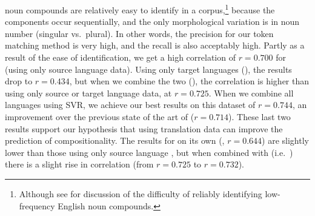 \documentclass[output=paper,modfonts,nonflat]{langsci/langscibook}
\begin{document}
 noun compounds are relatively easy to identify in a
corpus,\footnote{Although see \citet{Lapata:2003} for discussion of
  the difficulty of reliably identifying low-frequency English noun
  compounds.} because the components occur sequentially, and the only
morphological variation is in noun number (singular vs.\ plural). In
other words, the precision for our token matching method is very high,
and the recall is also acceptably high. Partly as a result of the ease
of identification, we get a high correlation of $r = 0.700$ for
\CSsource (using only source language data). Using only target
languages (\CStarg), the results drop to $r = 0.434$, but when we
combine the two (\CSsourcetarg), the correlation is higher than using
only source or target language data, at $r = 0.725$. When we combine
all languages using SVR, we achieve our best results on this dataset
of $r = 0.744$, an improvement over the previous state of the art of
\citet{reddy2011a} ($r = 0.714$). These last two results support our
hypothesis that using translation data can improve the prediction of
compositionality. The results for  on its own
(\CSstring, $r = 0.644$) are slightly lower than those using only
source language , but when combined with
\CSsourcetarg (i.e.\ \CSall) there is a slight rise in correlation
(from $r = 0.725$ to $r = 0.732$).




\end{document}
